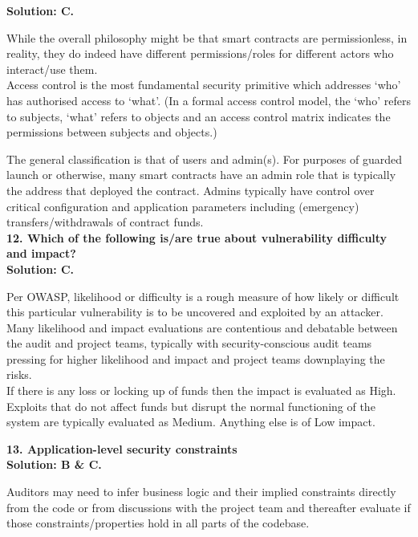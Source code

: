 \textbf{Solution: C.}

While the overall philosophy might be that smart contracts are permissionless, in reality, they do indeed have different permissions/roles for different actors who interact/use them.\\

Access control is the most fundamental security primitive which addresses `who' has authorised access to `what'.
(In a formal access control model, the `who' refers to subjects, `what' refers to objects and an access control matrix indicates the permissions between subjects and objects.)

The general classification is that of users and admin(s).
For purposes of guarded launch or otherwise, many smart contracts have an admin role that is typically the address that deployed the contract.
Admins typically have control over critical configuration and application parameters including (emergency) transfers/withdrawals of contract funds.\\

\textbf{12. Which of the following is/are true about vulnerability difficulty and impact?}\label{sec:exam6_q12}\\

\textbf{Solution: C.}

Per OWASP, likelihood or difficulty is a rough measure of how likely or difficult this particular vulnerability is to be uncovered and exploited by an attacker.\\

Many likelihood and impact evaluations are contentious and debatable between the audit and project teams, typically with security-conscious audit teams pressing for higher likelihood and impact and project teams downplaying the risks.\\

If there is any loss or locking up of funds then the impact is evaluated as High.
Exploits that do not affect funds but disrupt the normal functioning of the system are typically evaluated as Medium.
Anything else is of Low impact.\\

\pagebreak

\textbf{13. Application-level security constraints}\label{sec:exam6_q13}\\

\textbf{Solution: B \& C.}

Auditors may need to infer business logic and their implied constraints directly from the code or from discussions with the project team and thereafter evaluate if those constraints/properties hold in all parts of the codebase.\\

